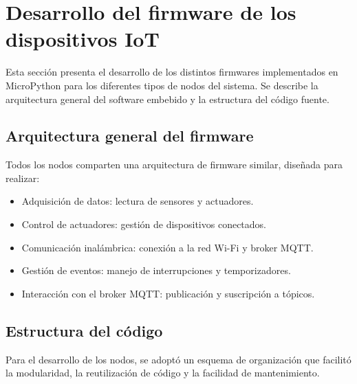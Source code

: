 \section{Desarrollo del firmware de los dispositivos IoT}


Esta sección presenta el desarrollo de los distintos firmwares implementados en
MicroPython para los diferentes tipos de nodos del sistema. Se describe la
arquitectura general del software embebido y la estructura del código fuente.

\subsection{Arquitectura general del firmware}

Todos los nodos comparten una arquitectura de firmware similar, diseñada para
realizar:

\begin{itemize}
    \item Adquisición de datos: lectura de sensores y actuadores.
    \item Control de actuadores: gestión de dispositivos conectados.
    \item Comunicación inalámbrica: conexión a la red Wi-Fi y broker MQTT.
    \item Gestión de eventos: manejo de interrupciones y temporizadores.
    \item Interacción con el broker MQTT: publicación y suscripción a tópicos.
\end{itemize}


\subsection{Estructura del código}

Para el desarrollo de los nodos, se adoptó un esquema de organización que
facilitó la modularidad, la reutilización de código y la facilidad de
mantenimiento.

